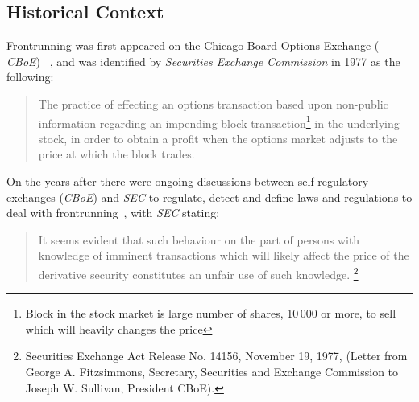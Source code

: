 \subsection{Historical Context}
Frontrunning was first appeared on the Chicago Board Options Exchange ( \textit{CBoE}) ~\cite{markham1988front}, and was identified by \textit{Securities Exchange Commission} in 1977 as the following:
\begin{quote}
The practice of effecting an options transaction based upon non-public information regarding an impending block transaction\footnote{Block in the stock market is large number of shares, 10\,000 or more, to sell which will heavily changes the price} in the underlying stock, in order to obtain a profit when the options market adjusts to the price at which the block trades. ~\cite{sec1978optionsmarket}
\end{quote} 



On the years after there were ongoing discussions between self-regulatory exchanges (\eg \textit{CBoE}) and  \textit{SEC} to regulate, detect and define laws and regulations to deal with frontrunning~\cite{markham1988front}, with \textit{SEC} stating: 
\begin{quote}
It seems evident that such behaviour on the part of persons with knowledge of imminent transactions which will likely affect the price of the derivative security constitutes an unfair use of such knowledge. \footnote{Securities Exchange Act Release No. 14156, November 19, 1977, (Letter from George A. Fitzsimmons, Secretary, Securities and Exchange Commission to Joseph W. Sullivan, President  CBoE).}
\end{quote} 

